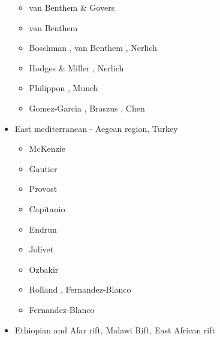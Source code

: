 \begin{itemize}
\begin{scriptsize}
\begin{itemize}
\item[\twothousandten] van Benthem \& Govers \cite{vago10}
\item[\twothousandthirteen] van Benthem \etal \cite{vags13}
\item[\twothousandfourteen] Boschman \etal \cite{bovt14}, van Benthem \etal \cite{vagw14},
                            Nerlich \etal \cite{necb14}
\item[\twothousandfifteen] Hodges \& Miller \cite{homi15}, Nerlich \etal \cite{necb15}
\item[\twothousandtwenty] Philippon \etal \cite{phvb20}, Munch \etal \cite{mugu20}
\item[\twothousandtwentyone] Gomez-Garcia \etal\cite{gols21}, Braszus \etal \cite{brga21},
                             Chen \etal \cite{chcb21}
\end{itemize}
\end{scriptsize}

\item{East mediterranean - Aegean region, Turkey} 

\begin{scriptsize}
\begin{itemize}
\item[\nineteenseventyeight] McKenzie \cite{mcke78b}
\item[\nineteenninetynine] Gautier \etal \cite{gabm99}
\item[\twothousandthree] Provost \etal \cite{prch03}
\item[\twothousandten] Capitanio \etal \cite{cazf10}
\item[\twothousandeleven] Endrun \etal \cite{enlm11}
\item[\twothousandthirteen] Jolivet \etal \cite{jofh13}
\item[\twothousandseventeen] Ozbakir \etal \cite{ozgw17}
\item[\twothousandtwenty] Rolland \etal \cite{rohb20}, Fernandez-Blanco \etal \cite{femb20}
\item[\twothousandtwentyone] Fernandez-Blanco \etal \cite{femc21}
\end{itemize}
\end{scriptsize}

\item{Ethiopian and Afar rift, Malawi Rift, East African rift} 


\end{itemize}
